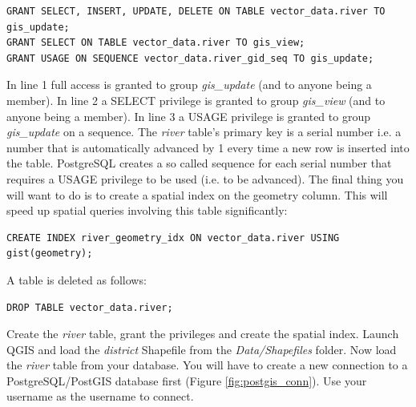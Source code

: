 \documentclass[a4paper,12pt,titlepage]{article}
\begin{document}
\begin{lstlisting}[caption={Granting privileges on table and sequence}]
GRANT SELECT, INSERT, UPDATE, DELETE ON TABLE vector_data.river TO gis_update;
GRANT SELECT ON TABLE vector_data.river TO gis_view;
GRANT USAGE ON SEQUENCE vector_data.river_gid_seq TO gis_update;
\end{lstlisting}

In line 1 full access is granted to group \textit{gis\_update} (and to anyone being a member). In line 2 a SELECT privilege is granted to group \textit{gis\_view} (and to anyone being a member). In line 3 a USAGE privilege is granted to group \textit{gis\_update} on a sequence. The \textit{river} table's primary key is a serial number i.e. a number that is automatically advanced by 1 every time a new row is inserted into the table. PostgreSQL creates a so called sequence for each serial number that requires a USAGE privilege to be used (i.e. to be advanced). The final thing you will want to do is to create a spatial index on the geometry column. This will speed up spatial queries involving this table significantly:

\begin{lstlisting}[caption={Creating a spatial index}]
CREATE INDEX river_geometry_idx ON vector_data.river USING gist(geometry);
\end{lstlisting}

A table is deleted as follows:

\begin{lstlisting}[caption={Deleting a schema}]
DROP TABLE vector_data.river;
\end{lstlisting}

Create the \textit{river} table, grant the privileges and create the spatial index. Launch QGIS and load the \textit{district} Shapefile from the \textit{Data/Shapefiles} folder. Now load the \textit{river} table from your database. You will have to create a new connection to a PostgreSQL/PostGIS database first (Figure \ref{fig:postgis_conn}). Use your username as the username to connect. 
\end{document}

